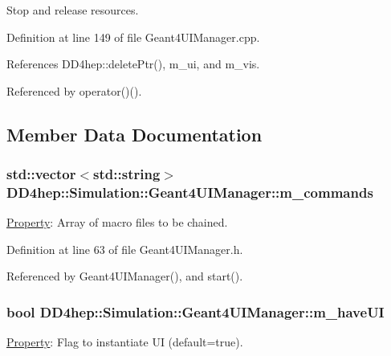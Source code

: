 Stop and release resources. 

Definition at line 149 of file Geant4UIManager.cpp.

References DD4hep::deletePtr(), m\_\-ui, and m\_\-vis.

Referenced by operator()().

\subsection{Member Data Documentation}
\hypertarget{class_d_d4hep_1_1_simulation_1_1_geant4_u_i_manager_a9c64c0675309cf8f76c23249e58cf3db}{
\subsubsection[{m\_\-commands}]{\setlength{\rightskip}{0pt plus 5cm}std::vector$<$std::string$>$ {\bf DD4hep::Simulation::Geant4UIManager::m\_\-commands}}}
\label{class_d_d4hep_1_1_simulation_1_1_geant4_u_i_manager_a9c64c0675309cf8f76c23249e58cf3db}


\hyperlink{class_d_d4hep_1_1_property}{Property}: Array of macro files to be chained. 

Definition at line 63 of file Geant4UIManager.h.

Referenced by Geant4UIManager(), and start().\hypertarget{class_d_d4hep_1_1_simulation_1_1_geant4_u_i_manager_a3045697f75ed358629f23f9716775f29}{
\subsubsection[{m\_\-haveUI}]{\setlength{\rightskip}{0pt plus 5cm}bool {\bf DD4hep::Simulation::Geant4UIManager::m\_\-haveUI}}}
\label{class_d_d4hep_1_1_simulation_1_1_geant4_u_i_manager_a3045697f75ed358629f23f9716775f29}


\hyperlink{class_d_d4hep_1_1_property}{Property}: Flag to instantiate UI (default=true). 

